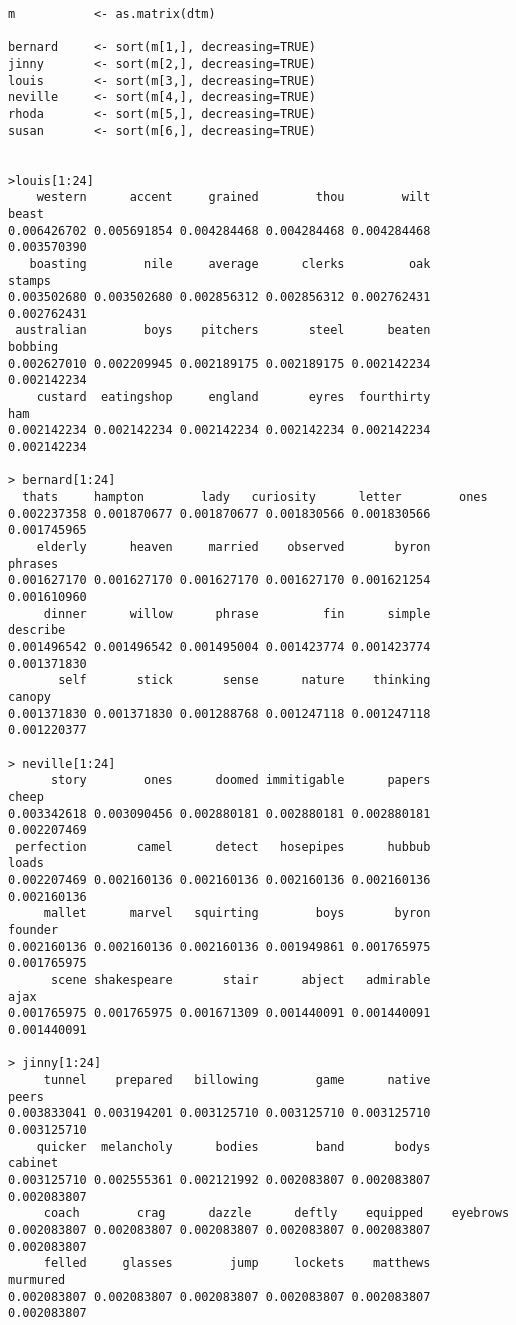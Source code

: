 \documentclass[
  12pt,
]{article}
\begin{document}
\begin{verbatim}
m           <- as.matrix(dtm)

bernard     <- sort(m[1,], decreasing=TRUE)
jinny       <- sort(m[2,], decreasing=TRUE)
louis       <- sort(m[3,], decreasing=TRUE)
neville     <- sort(m[4,], decreasing=TRUE)
rhoda       <- sort(m[5,], decreasing=TRUE)
susan       <- sort(m[6,], decreasing=TRUE)


>louis[1:24]
    western      accent     grained        thou        wilt       beast 
0.006426702 0.005691854 0.004284468 0.004284468 0.004284468 0.003570390 
   boasting        nile     average      clerks         oak      stamps 
0.003502680 0.003502680 0.002856312 0.002856312 0.002762431 0.002762431 
 australian        boys    pitchers       steel      beaten     bobbing 
0.002627010 0.002209945 0.002189175 0.002189175 0.002142234 0.002142234 
    custard  eatingshop     england       eyres  fourthirty         ham 
0.002142234 0.002142234 0.002142234 0.002142234 0.002142234 0.002142234 

> bernard[1:24]
  thats     hampton        lady   curiosity      letter        ones 
0.002237358 0.001870677 0.001870677 0.001830566 0.001830566 0.001745965 
    elderly      heaven     married    observed       byron     phrases 
0.001627170 0.001627170 0.001627170 0.001627170 0.001621254 0.001610960 
     dinner      willow      phrase         fin      simple    describe 
0.001496542 0.001496542 0.001495004 0.001423774 0.001423774 0.001371830 
       self       stick       sense      nature    thinking      canopy 
0.001371830 0.001371830 0.001288768 0.001247118 0.001247118 0.001220377 

> neville[1:24]
      story        ones      doomed immitigable      papers       cheep 
0.003342618 0.003090456 0.002880181 0.002880181 0.002880181 0.002207469 
 perfection       camel      detect   hosepipes      hubbub       loads 
0.002207469 0.002160136 0.002160136 0.002160136 0.002160136 0.002160136 
     mallet      marvel   squirting        boys       byron     founder 
0.002160136 0.002160136 0.002160136 0.001949861 0.001765975 0.001765975 
      scene shakespeare       stair      abject   admirable        ajax 
0.001765975 0.001765975 0.001671309 0.001440091 0.001440091 0.001440091 

> jinny[1:24]
     tunnel    prepared   billowing        game      native       peers 
0.003833041 0.003194201 0.003125710 0.003125710 0.003125710 0.003125710 
    quicker  melancholy      bodies        band       bodys     cabinet 
0.003125710 0.002555361 0.002121992 0.002083807 0.002083807 0.002083807 
     coach        crag      dazzle      deftly    equipped    eyebrows 
0.002083807 0.002083807 0.002083807 0.002083807 0.002083807 0.002083807 
     felled     glasses        jump     lockets    matthews    murmured 
0.002083807 0.002083807 0.002083807 0.002083807 0.002083807 0.002083807 


\end{verbatim}
\end{document}
